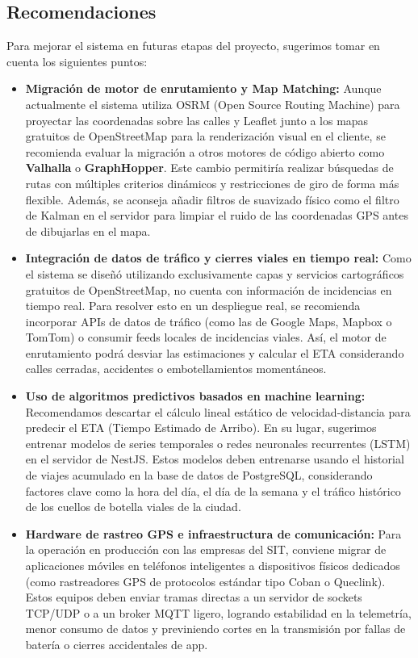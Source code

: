 \newpage
\subsection*{Recomendaciones}

Para mejorar el sistema en futuras etapas del proyecto, sugerimos tomar en cuenta los siguientes puntos:

\begin{itemize}
    \item \textbf{Migración de motor de enrutamiento y Map Matching:} Aunque actualmente el sistema utiliza OSRM (Open Source Routing Machine) para proyectar las coordenadas sobre las calles y Leaflet junto a los mapas gratuitos de OpenStreetMap para la renderización visual en el cliente, se recomienda evaluar la migración a otros motores de código abierto como \textbf{Valhalla} o \textbf{GraphHopper}. Este cambio permitiría realizar búsquedas de rutas con múltiples criterios dinámicos y restricciones de giro de forma más flexible. Además, se aconseja añadir filtros de suavizado físico como el filtro de Kalman en el servidor para limpiar el ruido de las coordenadas GPS antes de dibujarlas en el mapa.
    
    \item \textbf{Integración de datos de tráfico y cierres viales en tiempo real:} Como el sistema se diseñó utilizando exclusivamente capas y servicios cartográficos gratuitos de OpenStreetMap, no cuenta con información de incidencias en tiempo real. Para resolver esto en un despliegue real, se recomienda incorporar APIs de datos de tráfico (como las de Google Maps, Mapbox o TomTom) o consumir feeds locales de incidencias viales. Así, el motor de enrutamiento podrá desviar las estimaciones y calcular el ETA considerando calles cerradas, accidentes o embotellamientos momentáneos.
    
    \item \textbf{Uso de algoritmos predictivos basados en machine learning:} Recomendamos descartar el cálculo lineal estático de velocidad-distancia para predecir el ETA (Tiempo Estimado de Arribo). En su lugar, sugerimos entrenar modelos de series temporales o redes neuronales recurrentes (LSTM) en el servidor de NestJS. Estos modelos deben entrenarse usando el historial de viajes acumulado en la base de datos de PostgreSQL, considerando factores clave como la hora del día, el día de la semana y el tráfico histórico de los cuellos de botella viales de la ciudad.
    
    \item \textbf{Hardware de rastreo GPS e infraestructura de comunicación:} Para la operación en producción con las empresas del SIT, conviene migrar de aplicaciones móviles en teléfonos inteligentes a dispositivos físicos dedicados (como rastreadores GPS de protocolos estándar tipo Coban o Queclink). Estos equipos deben enviar tramas directas a un servidor de sockets TCP/UDP o a un broker MQTT ligero, logrando estabilidad en la telemetría, menor consumo de datos y previniendo cortes en la transmisión por fallas de batería o cierres accidentales de app.
    

\end{itemize}

